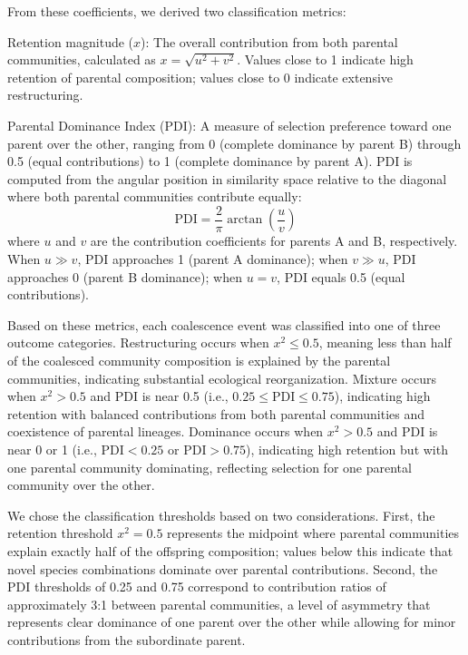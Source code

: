 From these coefficients, we derived two classification metrics:

Retention magnitude ($x$): The overall contribution from both parental communities, calculated as $x = \sqrt{u^2 + v^2}$. Values close to 1 indicate high retention of parental composition; values close to 0 indicate extensive restructuring.

Parental Dominance Index (PDI): A measure of selection preference toward one parent over the other, ranging from 0 (complete dominance by parent B) through 0.5 (equal contributions) to 1 (complete dominance by parent A). PDI is computed from the angular position in similarity space relative to the diagonal where both parental communities contribute equally:
\begin{equation}
\text{PDI} = \frac{2}{\pi} \arctan\left(\frac{u}{v}\right)
\label{eq:pdi}
\end{equation}
where $u$ and $v$ are the contribution coefficients for parents A and B, respectively. When $u \gg v$, PDI approaches 1 (parent A dominance); when $v \gg u$, PDI approaches 0 (parent B dominance); when $u = v$, PDI equals 0.5 (equal contributions).

Based on these metrics, each coalescence event was classified into one of three outcome categories. Restructuring occurs when $x^2 \leq 0.5$, meaning less than half of the coalesced community composition is explained by the parental communities, indicating substantial ecological reorganization. Mixture occurs when $x^2 > 0.5$ and PDI is near 0.5 (i.e., $0.25 \leq \text{PDI} \leq 0.75$), indicating high retention with balanced contributions from both parental communities and coexistence of parental lineages. Dominance occurs when $x^2 > 0.5$ and PDI is near 0 or 1 (i.e., $\text{PDI} < 0.25$ or $\text{PDI} > 0.75$), indicating high retention but with one parental community dominating, reflecting selection for one parental community over the other.

We chose the classification thresholds based on two considerations. First, the retention threshold $x^2 = 0.5$ represents the midpoint where parental communities explain exactly half of the offspring composition; values below this indicate that novel species combinations dominate over parental contributions. Second, the PDI thresholds of 0.25 and 0.75 correspond to contribution ratios of approximately 3:1 between parental communities, a level of asymmetry that represents clear dominance of one parent over the other while allowing for minor contributions from the subordinate parent.


